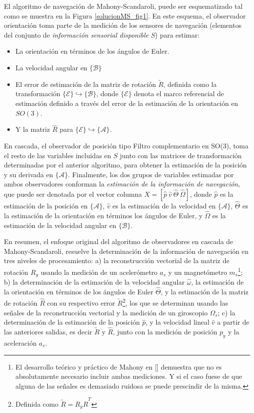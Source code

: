 \documentclass[conference]{IEEEtran}
\newcommand{\marco}[1]{\{\mathcal{#1}\}}
\begin{document}
El algoritmo de navegación de Mahony-Scandaroli, puede ser esquematizado tal como se muestra en la Figura \ref{solucionMS_fig1}. En este esquema, el observador orientación toma parte de la medición de los sensores de navegación (elementos del conjunto de \emph{información sensorial disponible} $S$) para estimar:
\begin{itemize}
\item La orientación en términos de los ángulos de Euler.
\item La velocidad angular en $\marco{B}$
\item El error de estimación de la matriz de rotación $\tilde{R}$, definida como la transformación $\marco{E}\hookrightarrow\marco{B}$, donde $\marco{E}$ denota el marco referencial de estimación definido a través del error de la estimación de la orientación en $SO(3)$.
\item Y la matriz $\hat{R}$ para $\marco{E}\hookrightarrow\marco{A}$.
\end{itemize}
En cascada, el observador de posición tipo Filtro complementario en SO(3), toma el resto de las variables incluidas en $S$ junto con las matrices de transformación determinadas por el anterior algoritmo, para obtener la estimación de la posición y su derivada en $\marco{A}$. Finalmente, los dos grupos de variables estimadas por ambos observadores conforman la \emph{estimación de la información de navegación}, que puede ser denotada por el vector columna $X=[\hat{p}~\hat{v}~\hat{\Theta}~\hat{\Omega}]$, donde $\hat{p}$ es la estimación de la posición en $\marco{A}$, $\hat{v}$ es la estimación de la velocidad en $\marco{A}$, $\hat{\Theta}$ es la estimación de la orientación en términos los ángulos de Euler, y $\hat{\Omega}$ es la estimación de la velocidad angular en $\marco{B}$.\par
En resumen, el enfoque original del algoritmo de observadores en cascada de Mahony-Scandaroli, resuelve la determinación de la información de navegación en tres niveles de procesamiento:
a) la reconstrucción vectorial de la matriz de rotación $R_y$ usando la medición de un acelerómetro $a_s$ y un magnetómetro $m_s$\footnote{El desarrollo teórico y práctico de Mahony en [\cite{Mahony2008}] demuestra que no es absolutamente necesario incluir ambas mediciones. Y si el caso fuese de que alguna de las señales es demasiado ruidosa se puede prescindir de la misma.}; b) la determinación de la estimación de la velocidad angular $\hat{\omega}$, la estimación de la orientación en términos de los ángulos de Euler $\hat{\Theta}$, y la estimación de la matriz de rotación $\hat{R}$ con su respectivo error $\tilde{R}$\footnote{Definida como $\tilde{R}=R_y\hat{R}^T$}, los que se determinan usando las señales de la reconstrucción vectorial y la medición de un giroscopio $\Omega_s$; c) la determinación de la estimación de la posición $\hat{p}$, y la velocidad lineal $\hat{v}$ a partir de las anteriores salidas, es decir $\tilde{R}$ y $\hat{R}$, junto con la medición de posición $p_y$ y la aceleración $a_s$. 
\end{document}
